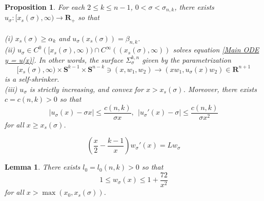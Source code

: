 \documentclass[10pt,a4paper]{amsart}
\newtheorem{proposition}{Proposition}
\newtheorem{lemma}{Lemma}
\begin{document}
\begin{proposition}\label{Existence of trumpets}
For each $2 \leq k \leq n-1$, $0 < \sigma < \sigma_{n,k}$, there exists $u_{\sigma} : [x_{s}(\sigma) , \infty) \to \mathbf{R}_+$ so that\\\\
(i) $x_{s}(\sigma) \geq \alpha_k$ and $u_{\sigma}(x_{s}(\sigma)) = \beta_{n,k}$.\\
(ii) $u_{\sigma} \in C^0([x_{s}(\sigma), \infty)) \cap C^{\infty}((x_{s}(\sigma), \infty))$  solves equation \eqref{Main ODE y = u(x)}. In other words, the surface $\Sigma^{k,n}_{\sigma}$ given by the parametrization
\begin{equation}
    [x_s(\sigma) , \infty) \times \mathbf{S}^{k-1}\times \mathbf{S}^{n-k} \ni (x, w_1, w_2) \to (xw_1, u_{\sigma}(x)w_2) \in  \mathbf{R}^{n+1}
\end{equation}
is a self-shrinker. \\
(iii) $u_{\sigma}$ is strictly increasing, and convex for $x > x_{s}(\sigma)$. Moreover, there exists $c = c(n,k) > 0$ so that
\begin{equation}\label{asymptotics of trumpets}
    |u_{\sigma}(x) - \sigma x| \leq \frac{c(n,k)}{\sigma x}, \ \ |u_{\sigma}'(x) - \sigma| \leq \frac{c(n,k)}{\sigma x^2}
\end{equation}
for all $x \geq x_{s}(\sigma)$. 
\end{proposition}

\begin{equation}\label{ODE for w in trumpet}
    (\frac{x}{2} - \frac{k-1}{x})w_{\sigma}'(x) = Lw_{\sigma}
\end{equation}

\begin{lemma}\label{Derivative bound for trumpets}
    There exists $l_0 = l_0(n, k) > 0$ so that
    \begin{equation}
        1 \leq w_{\sigma}(x) \leq 1 + \frac{72}{x^2}
    \end{equation}
    for all $x >\max(x_0, x_{s}(\sigma))$.
\end{lemma}
\end{document}
